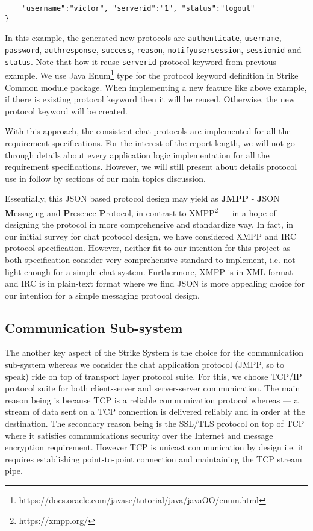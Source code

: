\documentclass[dareport.tex]{subfiles}
\begin{document}
\begin{enumerate}[leftmargin=*]
\begin{small}
\begin{verbatim}
    "username":"victor", "serverid":"1", "status":"logout"
}
\end{verbatim}
\end{small}
In this example, the generated new protocols are \verb|authenticate|, \verb|username|, \verb|password|, \verb|authresponse|, \verb|success|, \verb|reason|, \verb|notifyusersession|, \verb|sessionid| and \verb|status|. Note that how it reuse \verb|serverid| protocol keyword from previous example. We use Java Enum\footnote{https://docs.oracle.com/javase/tutorial/java/javaOO/enum.html} type for the protocol keyword definition in Strike Common module package. When implementing a new feature like above example, if there is existing protocol keyword then it will be reused. Otherwise, the new protocol keyword will be created. 
\end{enumerate}

With this approach, the consistent chat protocols are implemented for all the requirement specifications. For the interest of the report length, we will not go through details about every application logic implementation for all the requirement specifications. However, we will still present about details protocol use in follow by sections of our main topics discussion.

Essentially, this JSON based protocol design may yield as \textbf{JMPP} - \textbf{J}SON \textbf{M}essaging and \textbf{P}resence \textbf{P}rotocol, in contrast to XMPP\footnote{https://xmpp.org/} --- in a hope of designing the protocol in more comprehensive and standardize way. In fact, in our initial survey for chat protocol design, we have considered XMPP and IRC protocol specification. However, neither fit to our intention for this project as both specification consider very comprehensive standard to implement, i.e. not light enough for a simple chat system. Furthermore, XMPP is in XML format\cite{xmpp} and IRC is in plain-text format\cite{irc} where we find JSON is more appealing choice for our intention for a simple messaging protocol design.

\subsection{Communication Sub-system}
The another key aspect of the Strike System is the choice for the communication sub-system whereas we consider the chat application protocol (JMPP, so to speak) ride on top of transport layer protocol suite. For this, we choose TCP/IP protocol suite for both client-server and server-server communication. The main reason being is because TCP is a reliable communication protocol whereas --- a stream of data sent on a TCP connection is delivered reliably and in order at the destination\cite{tcp}. The secondary reason being is the SSL/TLS protocol on top of TCP where it satisfies communications security over the Internet and message encryption requirement\cite{tls}. However TCP is unicast communication by design i.e. it requires establishing point-to-point connection and maintaining the TCP stream pipe. 
\end{document}
